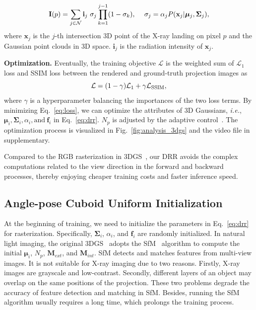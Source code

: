 \documentclass[runningheads]{llncs}
\begin{document}
\vspace{-1.2mm}
\begin{equation}
	\small
	\mathbf{I}(p) = \sum_{j \in \mathcal{N}} \mathbf{i}_j~\sigma_j  \prod_{k=1}^{j-1}(1-\sigma_k),~~~~\sigma_j = \alpha_j P(\mathbf{x}_j | \bm{\mu}_j, \mathrm{\bf \Sigma}_j),
	\vspace{-0.8mm}
\end{equation}
where $\mathbf{x}_j$ is the $j$-th intersection 3D point of the X-ray landing on pixel $p$ and the Gaussian point clouds in 3D space. $\mathbf{i}_j$ is the radiation intensity of $\mathbf{x}_j$.

\vspace{1mm}
\noindent\textbf{Optimization.} Eventually, the  training objective $\mathcal{L}$ is the weighted sum of $\mathcal{L}_1$ loss and SSIM loss between the rendered and ground-truth projection images as
\vspace{-2.5mm}
\begin{equation}
	\small
	\mathcal{L} = (1 - \gamma) \mathcal{L}_1 + \gamma \mathcal{L}_{\text{SSIM}},
 \vspace{0.5mm}
\label{eq:loss}
\end{equation}
where $\gamma$ is a hyperparameter balancing the importances of the two loss terms. By minimizing Eq.~\eqref{eq:loss}, we can optimize the attributes of 3D Gaussians, \emph{i.e.}, $\bm{\mu}_i, \mathbf{\Sigma}_i, \alpha_i, \text{and} ~\mathbf{f}_i$ in Eq.~\eqref{eq:drr}. $N_p$ is adjusted by the adaptive control~\cite{3dgs}. The optimization process is visualized in Fig.~\ref{fig:analysis_3dgs} and the video file in supplementary.

Compared to the RGB rasterization in 3DGS~\cite{3dgs}, our DRR avoids the complex computations related to the view direction in the forward and backward processes, thereby enjoying cheaper training costs and faster inference speed.

\vspace{-3mm}
\subsection{Angle-pose Cuboid Uniform Initialization}
\vspace{-0.5mm}
At the beginning of training, we need to initialize the parameters in Eq.~\eqref{eq:drr} for rasterization. Specifically, $\mathbf{\Sigma}_i$, $\alpha_i$, and $\mathbf{f}_i$ are randomly initialized. In natural light imaging, the original 3DGS~\cite{3dgs} adopts the SfM~\cite{sfm} algorithm to compute the initial $\bm{\mu}_i$, $N_p$, $\mathbf{M}_{ext}$, and $\mathbf{M}_{int}$. SfM detects and matches features from multi-view images. It is not suitable for X-ray imaging due to two reasons. Firstly, X-ray images are grayscale and low-contrast. Secondly, different layers of an object may overlap on the same positions of the projection. These two problems degrade the accuracy of feature detection and matching in SfM. Besides, running the SfM algorithm usually requires a long time, which prolongs the training process.
\end{document}
